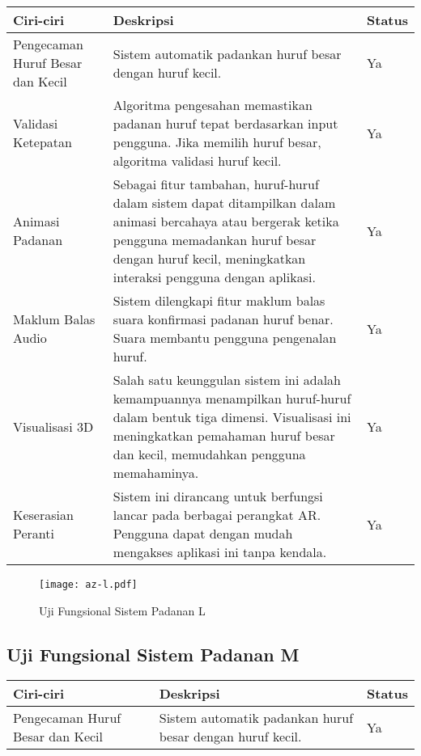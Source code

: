 \begin{itemize}
\begin{itemize}
\begin{itemize}
\begin{itemize}
\begin{itemize}
\begin{itemize}
\begin{itemize}
\begin{itemize}
\begin{flushleft}
\begin{tabular}{>{\raggedright}p{3cm}p{9cm}>{\centering\arraybackslash}p{2cm}}
\toprule
\textbf{Ciri-ciri} & \textbf{Deskripsi} & \textbf{Status} \\
\midrule
Pengecaman Huruf Besar dan Kecil & Sistem automatik padankan huruf besar dengan huruf kecil. & Ya \\

Validasi Ketepatan & Algoritma pengesahan memastikan padanan huruf tepat berdasarkan input pengguna. Jika memilih huruf besar, algoritma validasi huruf kecil. & Ya \\

Animasi Padanan & Sebagai fitur tambahan, huruf-huruf dalam sistem dapat ditampilkan dalam animasi bercahaya atau bergerak ketika pengguna memadankan huruf besar dengan huruf kecil, meningkatkan interaksi pengguna dengan aplikasi. & Ya \\

Maklum Balas Audio & Sistem dilengkapi fitur maklum balas suara konfirmasi padanan huruf benar. Suara membantu pengguna pengenalan huruf. & Ya \\

Visualisasi 3D & Salah satu keunggulan sistem ini adalah kemampuannya menampilkan huruf-huruf dalam bentuk tiga dimensi. Visualisasi ini meningkatkan pemahaman huruf besar dan kecil, memudahkan pengguna memahaminya. & Ya \\

Keserasian Peranti & Sistem ini dirancang untuk berfungsi lancar pada berbagai perangkat AR. Pengguna dapat dengan mudah mengakses aplikasi ini tanpa kendala. & Ya \\
\bottomrule
\end{tabular}

\begin{figure}
    \centering
    \texttt{[image: az-l.pdf]}
    \caption{Uji Fungsional  Sistem Padanan L }
    \label{fig:az-l.pdf}
\end{figure}
\subsection{Uji Fungsional  Sistem Padanan M}

\begin{tabular}{>{\raggedright}p{3cm}p{9cm}>{\centering\arraybackslash}p{2cm}}
\toprule
\textbf{Ciri-ciri} & \textbf{Deskripsi} & \textbf{Status} \\
\midrule
Pengecaman Huruf Besar dan Kecil & Sistem automatik padankan huruf besar dengan huruf kecil. & Ya \\


\end{tabular}
\end{flushleft}
\end{itemize}
\end{itemize}
\end{itemize}
\end{itemize}
\end{itemize}
\end{itemize}
\end{itemize}
\end{itemize}
